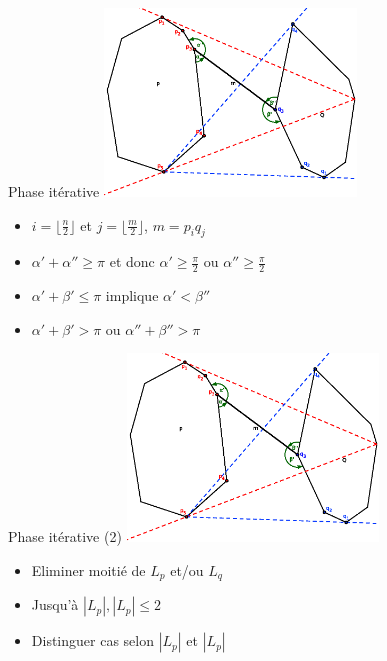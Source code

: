 \documentclass{beamer}
\begin{document}
\begin{frame}{Phase itérative}
	\includegraphics[height=5cm]{dmin.eps}
	\begin{itemize}
	\item $i = \lfloor \frac{n}{2} \rfloor$ et $j = \lfloor \frac{m}{2} \rfloor$, $m = p_{i}q_{j}$
	\item $\alpha' + \alpha'' \geq \pi$ et donc $\alpha' \geq \frac{\pi}{2}$ ou $\alpha'' \geq \frac{\pi}{2}$
	\item $\alpha' + \beta' \leq \pi$ implique $\alpha' < \beta''${}
	\item $\alpha' + \beta' > \pi$ ou $\alpha'' + \beta'' > \pi$
	\end{itemize}
\end{frame}

\begin{frame}{Phase itérative (2)}
	\includegraphics[height=5cm]{dmin.eps}
	\begin{itemize}
	\item Eliminer moitié de $L_p$ et/ou $L_q$
	\item Jusqu'à $|L_p|, |L_p| \leq 2$
	\item Distinguer cas selon $|L_p|$ et $|L_p|$
	\end{itemize}
\end{frame}
\end{document}
